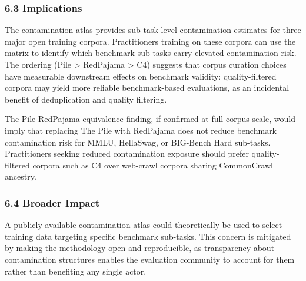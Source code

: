 \subsubsection{6.3 Implications}

The contamination atlas provides sub-task-level contamination estimates for three major open training corpora. Practitioners training on these corpora can use the matrix to identify which benchmark sub-tasks carry elevated contamination risk. The ordering (Pile > RedPajama > C4) suggests that corpus curation choices have measurable downstream effects on benchmark validity: quality-filtered corpora may yield more reliable benchmark-based evaluations, as an incidental benefit of deduplication and quality filtering.

The Pile-RedPajama equivalence finding, if confirmed at full corpus scale, would imply that replacing The Pile with RedPajama does not reduce benchmark contamination risk for MMLU, HellaSwag, or BIG-Bench Hard sub-tasks. Practitioners seeking reduced contamination exposure should prefer quality-filtered corpora such as C4 over web-crawl corpora sharing CommonCrawl ancestry.

\subsubsection{6.4 Broader Impact}

A publicly available contamination atlas could theoretically be used to select training data targeting specific benchmark sub-tasks. This concern is mitigated by making the methodology open and reproducible, as transparency about contamination structures enables the evaluation community to account for them rather than benefiting any single actor.

